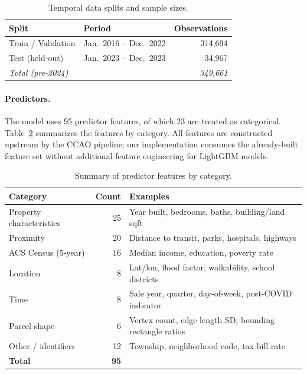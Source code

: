 \documentclass[12pt]{article}
\theoremstyle{plain}
\theoremstyle{definition}
\newcommand{\1}{\mathbf{1}}
\begin{document}
\begin{table}[!ht]
\centering
\caption{Temporal data splits and sample sizes.}
\label{tab:data_splits}
\begin{tabular}{llr}
\toprule
\textbf{Split} & \textbf{Period} & \textbf{Observations} \\
\midrule
Train / Validation  & Jan.\ 2016 -- Dec.\ 2022 & 314{,}694 \\
Test (held-out)     & Jan.\ 2023 -- Dec.\ 2023 & 34{,}967 \\
\midrule
\textit{Total (pre-2024)} & & \textit{349{,}661} \\
\bottomrule
\end{tabular}
\end{table}

\paragraph{Predictors.} The model uses 95 predictor features, of which 23 are treated as categorical. Table~\ref{tab:feature_groups} summarizes the features by category. All features are constructed upstream by the CCAO pipeline; our implementation consumes the already-built feature set without additional feature engineering for LightGBM models.

\begin{table}[!ht]
\centering
\caption{Summary of predictor features by category.}
\label{tab:feature_groups}
\begin{tabular}{lrl}
\toprule
\textbf{Category} & \textbf{Count} & \textbf{Examples} \\
\midrule
Property characteristics & 25 & Year built, bedrooms, baths, building/land sqft \\
Proximity                & 20 & Distance to transit, parks, hospitals, highways \\
ACS Census (5-year)      & 16 & Median income, education, poverty rate \\
Location                 & 8  & Lat/lon, flood factor, walkability, school districts \\
Time                     & 8  & Sale year, quarter, day-of-week, post-COVID indicator \\
Parcel shape             & 6  & Vertex count, edge length SD, bounding rectangle ratios \\
Other / identifiers      & 12 & Township, neighborhood code, tax bill rate \\
\midrule
\textbf{Total}           & \textbf{95} & \\
\bottomrule
\end{tabular}
\end{table}
\end{document}
